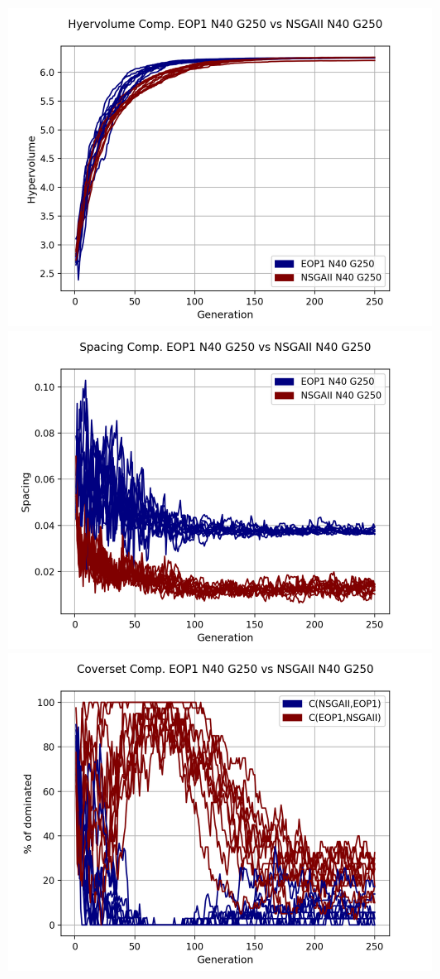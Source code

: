 \begin{figure}[H]
\centering
\includegraphics[scale=0.35]{../METRICS_PLOTS/Hypervol_COMP_EOP1N40G250_NSGAIIN40G250.png}
\includegraphics[scale=0.35]{../METRICS_PLOTS/Spacing_COMP_EOP1N40G250_NSGAIIN40G250.png}
\includegraphics[scale=0.35]{../METRICS_PLOTS/CoverSet_COMP_EOP1N40G250_NSGAIIN40G250.png}\\

\end{figure}
